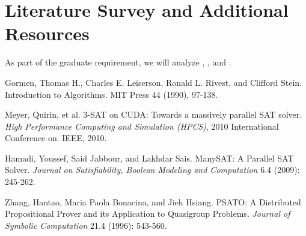 \documentclass[paper=a4, fontsize=10pt]{scrartcl} %
\begin{document}
\section{Literature Survey and Additional Resources}
As part of the graduate requirement, we will analyze \cite{paper1}, \cite{paper2},
and \cite{paper3}. 


\begin{thebibliography}{9}

 Gormen, Thomas H., Charles E. Leiserson, Ronald L. Rivest, and Clifford Stein. Introduction to Algorithms. MIT Press 44 (1990), 97-138.

 Meyer, Quirin, et al. 3-SAT on CUDA: Towards a massively parallel SAT solver. \emph{High Performance Computing and Simulation (HPCS)}, 2010 International Conference on. IEEE, 2010.

 Hamadi, Youssef, Said Jabbour, and Lakhdar Sais. ManySAT: A Parallel SAT Solver. \emph{Journal on Satisfiability, Boolean Modeling and Computation} 6.4 (2009): 245-262.

 Zhang, Hantao, Maria Paola Bonacina, and Jieh Hsiang. PSATO: A Distributed Propositional Prover and its Application to Quasigroup Problems. \emph{Journal of Symbolic Computation} 21.4 (1996): 543-560.

\end{thebibliography}
\end{document}
